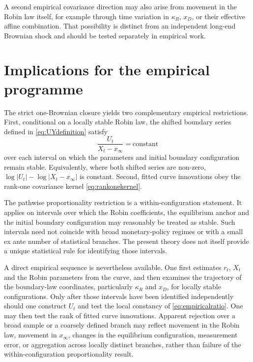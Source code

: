 \documentclass[11pt]{article}
\numberwithin{equation}{section}
\begin{document}
A second empirical covariance direction may also arise from movement in the Robin law itself, for example through time variation in $\kappa_R$, $x_D$, or their effective affine combination. That possibility is distinct from an independent long-end Brownian shock and should be tested separately in empirical work.

\section{Implications for the empirical programme}

The strict one-Brownian closure yields two complementary empirical restrictions. First, conditional on a locally stable Robin law, the shifted boundary series defined in \eqref{eq:UYdefinition} satisfy
\begin{equation}
 \frac{U_t}{X_t-x_\infty}=\text{constant}
 \label{eq:empiricalratio}
\end{equation}
over each interval on which the parameters and initial boundary configuration remain stable. Equivalently, where both shifted series are non-zero, $\log|U_t|-\log|X_t-x_\infty|$ is constant. Second, fitted curve innovations obey the rank-one covariance kernel \eqref{eq:rankonekernel}.

The pathwise proportionality restriction is a within-configuration statement. It applies on intervals over which the Robin coefficients, the equilibrium anchor and the initial boundary configuration may reasonably be treated as stable. Such intervals need not coincide with broad monetary-policy regimes or with a small ex ante number of statistical branches. The present theory does not itself provide a unique statistical rule for identifying those intervals.

A direct empirical sequence is nevertheless available. One first estimates $r_t$, $X_t$ and the Robin parameters from the curve, and then examines the trajectory of the boundary-law coordinates, particularly $\kappa_R$ and $x_D$, for locally stable configurations. Only after those intervals have been identified independently should one construct $U_t$ and test the local constancy of \eqref{eq:empiricalratio}. One may then test the rank of fitted curve innovations. Apparent rejection over a broad sample or a coarsely defined branch may reflect movement in the Robin law, movement in $x_\infty$, changes in the equilibrium configuration, measurement error, or aggregation across locally distinct branches, rather than failure of the within-configuration proportionality result.
\end{document}
